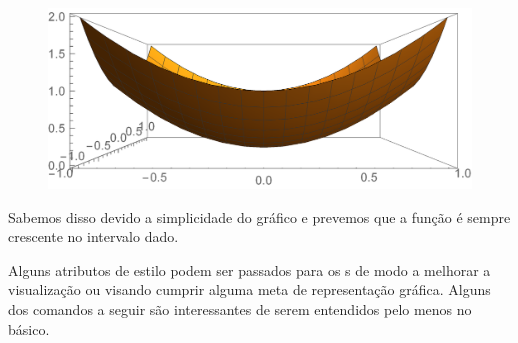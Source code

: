 \documentclass[a4paper, 12pt]{article}
\begin{document}
	\begin{figure}[!h]
		\centering
		\includegraphics[scale=.55]{images/parabola3dfront}
	\end{figure}

	Sabemos disso devido a simplicidade do gráfico e prevemos que a função é sempre crescente no intervalo dado.
	
	Alguns atributos de estilo podem ser passados para os s de modo a melhorar a visualização ou visando cumprir alguma meta de representação gráfica. Alguns dos comandos a seguir são interessantes de serem entendidos pelo menos no básico.
	
\end{document}
